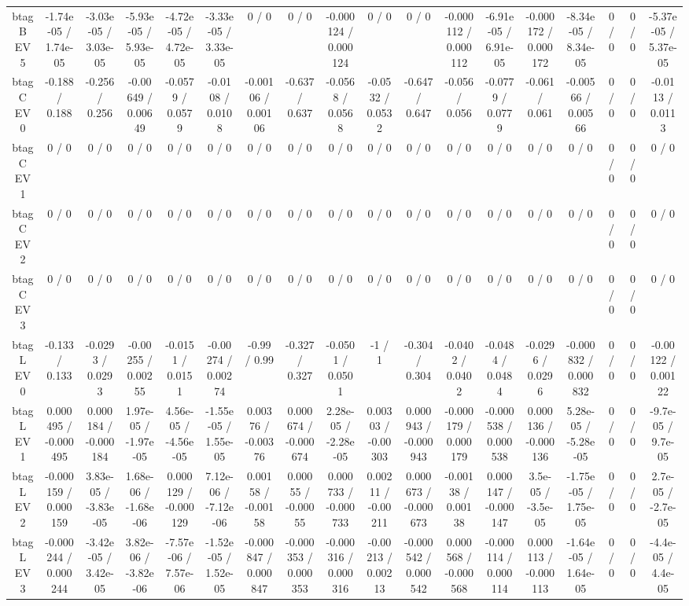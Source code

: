 \documentclass[10pt]{article}
\begin{document}
\begin{table}[htbp]
\begin{center}
\begin{tabular}{|c|c|c|c|c|c|c|c|c|c|c|c|c|c|c|c|c|c|}
  btag B EV 5 & -1.74e-05 / 1.74e-05 & -3.03e-05 / 3.03e-05 & -5.93e-05 / 5.93e-05 & -4.72e-05 / 4.72e-05 & -3.33e-05 / 3.33e-05 & 0 / 0 & 0 / 0 & -0.000124 / 0.000124 & 0 / 0 & 0 / 0 & -0.000112 / 0.000112 & -6.91e-05 / 6.91e-05 & -0.000172 / 0.000172 & -8.34e-05 / 8.34e-05 & 0 / 0 & 0 / 0 & -5.37e-05 / 5.37e-05 \\ 
  btag C EV 0 & -0.188 / 0.188 & -0.256 / 0.256 & -0.00649 / 0.00649 & -0.0579 / 0.0579 & -0.0108 / 0.0108 & -0.00106 / 0.00106 & -0.637 / 0.637 & -0.0568 / 0.0568 & -0.0532 / 0.0532 & -0.647 / 0.647 & -0.056 / 0.056 & -0.0779 / 0.0779 & -0.061 / 0.061 & -0.00566 / 0.00566 & 0 / 0 & 0 / 0 & -0.0113 / 0.0113 \\ 
  btag C EV 1 & 0 / 0 & 0 / 0 & 0 / 0 & 0 / 0 & 0 / 0 & 0 / 0 & 0 / 0 & 0 / 0 & 0 / 0 & 0 / 0 & 0 / 0 & 0 / 0 & 0 / 0 & 0 / 0 & 0 / 0 & 0 / 0 & 0 / 0 \\ 
  btag C EV 2 & 0 / 0 & 0 / 0 & 0 / 0 & 0 / 0 & 0 / 0 & 0 / 0 & 0 / 0 & 0 / 0 & 0 / 0 & 0 / 0 & 0 / 0 & 0 / 0 & 0 / 0 & 0 / 0 & 0 / 0 & 0 / 0 & 0 / 0 \\ 
  btag C EV 3 & 0 / 0 & 0 / 0 & 0 / 0 & 0 / 0 & 0 / 0 & 0 / 0 & 0 / 0 & 0 / 0 & 0 / 0 & 0 / 0 & 0 / 0 & 0 / 0 & 0 / 0 & 0 / 0 & 0 / 0 & 0 / 0 & 0 / 0 \\ 
  btag L EV 0 & -0.133 / 0.133 & -0.0293 / 0.0293 & -0.00255 / 0.00255 & -0.0151 / 0.0151 & -0.00274 / 0.00274 & -0.99 / 0.99 & -0.327 / 0.327 & -0.0501 / 0.0501 & -1 / 1 & -0.304 / 0.304 & -0.0402 / 0.0402 & -0.0484 / 0.0484 & -0.0296 / 0.0296 & -0.000832 / 0.000832 & 0 / 0 & 0 / 0 & -0.00122 / 0.00122 \\ 
  btag L EV 1 & 0.000495 / -0.000495 & 0.000184 / -0.000184 & 1.97e-05 / -1.97e-05 & 4.56e-05 / -4.56e-05 & -1.55e-05 / 1.55e-05 & 0.00376 / -0.00376 & 0.000674 / -0.000674 & 2.28e-05 / -2.28e-05 & 0.00303 / -0.00303 & 0.000943 / -0.000943 & -0.000179 / 0.000179 & -0.000538 / 0.000538 & 0.000136 / -0.000136 & 5.28e-05 / -5.28e-05 & 0 / 0 & 0 / 0 & -9.7e-05 / 9.7e-05 \\ 
  btag L EV 2 & -0.000159 / 0.000159 & 3.83e-05 / -3.83e-05 & 1.68e-06 / -1.68e-06 & 0.000129 / -0.000129 & 7.12e-06 / -7.12e-06 & 0.00158 / -0.00158 & 0.00055 / -0.00055 & 0.000733 / -0.000733 & 0.00211 / -0.00211 & 0.000673 / -0.000673 & -0.00138 / 0.00138 & 0.000147 / -0.000147 & 3.5e-05 / -3.5e-05 & -1.75e-05 / 1.75e-05 & 0 / 0 & 0 / 0 & 2.7e-05 / -2.7e-05 \\ 
  btag L EV 3 & -0.000244 / 0.000244 & -3.42e-05 / 3.42e-05 & 3.82e-06 / -3.82e-06 & -7.57e-06 / 7.57e-06 & -1.52e-05 / 1.52e-05 & -0.000847 / 0.000847 & -0.000353 / 0.000353 & -0.000316 / 0.000316 & -0.00213 / 0.00213 & -0.000542 / 0.000542 & 0.000568 / -0.000568 & -0.000114 / 0.000114 & 0.000113 / -0.000113 & -1.64e-05 / 1.64e-05 & 0 / 0 & 0 / 0 & -4.4e-05 / 4.4e-05 \\ 

\end{tabular}
\end{center}
\end{table}
\end{document}
